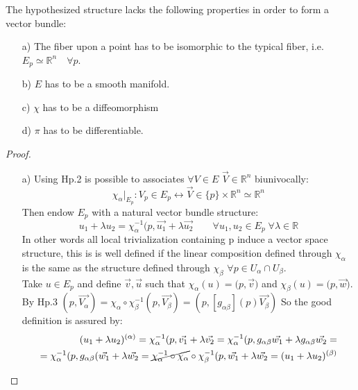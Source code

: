 \documentclass[a4paper,12pt]{scrartcl}    %
\begin{document}
The hypothesized structure lacks the following properties in order to form a vector bundle:
\begin{itemize}
\item[a)] The fiber upon a point has to be isomorphic to the typical fiber, i.e. $ E_p \simeq \mathbb{R}^n \quad \forall p$.

\item[b)] $E$ has to be a smooth manifold.

\item[c)] $\chi$ has to be a diffeomorphism

\item[d)] $\pi$ has to be differentiable.
\end{itemize}

\begin{proof}
\begin{itemize}
\item[a)]  Using Hp.2 is possible to associates $\forall V \in E$ $\vec{V}\in \mathbb{R}^n$ biunivocally:
	\begin{displaymath}
	\chi_\alpha \vert_{E_p}: V_p \in E_p \leftrightarrow \vec{V} \in \{p\} \times \mathbb{R}^n \simeq 	\mathbb{R}^n 
	\end{displaymath}
Then endow $E_p$ with a natural vector bundle structure:
	\begin{displaymath}
	u_1 + \lambda u_2 = \chi_\alpha^{-1} \big( p, \vec{u_1} + \lambda \vec{u_2} \qquad \forall u_1,u_2 \in E_p \; \forall \lambda \in \mathbb{R}
	\end{displaymath}
\vspace{5mm}
In other words all local trivialization containing p induce a vector space structure, this is is well defined if the linear composition defined through $\chi_\alpha$ is the same as the structure defined through $\chi_\beta$ $\forall p \in U_\alpha \cap U_\beta$.
\\
Take $u \in E_p$ and define $\vec{v},\vec{u}$ such that $\chi_\alpha (u) = \big(p, \vec{v} \big)$ and $\chi_\beta (u) = \big(p, \vec{w} \big)$.
\\
By Hp.3 $(p, \vec{V_\alpha})= \chi_\alpha \circ \chi_\beta^{-1}(p, \vec{V_\beta}) = (p, [g_{\alpha \beta}](p)\vec{V_\beta})$
So the good definition is assured by:
	\begin{eqnarray}
		(u_1 + \lambda u_2)^{(\alpha)} = \chi_\alpha^{-1} (p, \vec{v_1} + \lambda \vec{v_2} =
		\chi_\alpha^{-1} (p, g_{\alpha \beta}\vec{w_1} + \lambda g_{\alpha \beta}\vec{w_2} =\\=
		\chi_\alpha^{-1} (p, g_{\alpha \beta}(\vec{w_1} + \lambda \vec{w_2} =
		\cancel{\chi_\alpha^{-1} \circ\chi_\alpha }\circ \chi_\beta^{-1}(p, \vec{w_1} + \lambda \vec{w_2}= (u_1 + \lambda u_2)^{(\beta)}
	\end{eqnarray}


\end{itemize}
\end{proof}
\end{document}
